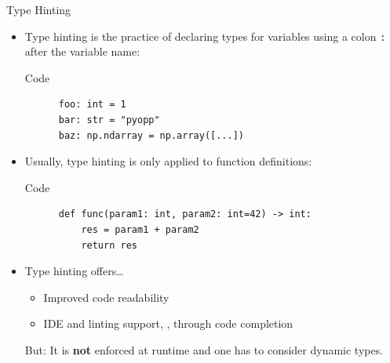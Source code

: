 \begin{frame}[fragile]{
    Type Hinting
    \hfill
  }
  \begin{itemize}
    \setlength{\itemsep}{1.5em}
    \item Type hinting is the practice of declaring types for variables using a colon \texttt{:}
  after the variable name:
  \begin{block}{Code}
    \begin{verbatim}
      foo: int = 1
      bar: str = "pyopp"
      baz: np.ndarray = np.array([...])
    \end{verbatim}
  \end{block}

  \item Usually, type hinting is only applied to function definitions:
  \begin{block}{Code}
    \begin{verbatim}
      def func(param1: int, param2: int=42) -> int:
          res = param1 + param2
          return res
    \end{verbatim}
  \end{block}

  \item Type hinting offers\dots
  \begin{itemize}
    \item Improved code readability
    \item IDE and linting support, \eg{}, through code completion
  \end{itemize}
  But: It is \textbf{not} enforced at runtime and one has to consider dynamic types.
  \end{itemize}
\end{frame}


